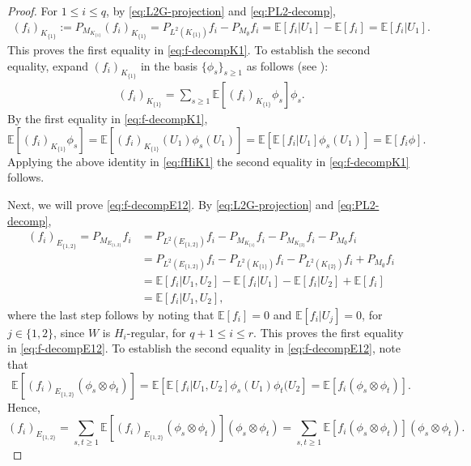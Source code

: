 \documentclass[11pt,reqno]{amsart}
\numberwithin{equation}{section}
\theoremstyle{definition}
\begin{document}
\begin{proof}
For $1 \leq i \leq q$, by \eqref{eq:L2G-projection} and \eqref{eq:PL2-decomp},
\begin{align*}
(f_{i})_{K_{\{1\}}}:= P_{ M_{K_{\{1\}}}} (f_{i})_{K_{\{1\}}} = P_{L^2(K_{\{1\}})} f_{i} -P_{M_\emptyset} f_{i}
= \mathbb E[f_i|U_1]- \mathbb E[f_i] = \mathbb E[f_i|U_1] .
\end{align*}
This proves the first equality in \eqref{eq:f-decompK1}. To establish the second equality, expand $(f_{i})_{K_{\{1\}}}$ in the basis $\{\phi_{s}\}_{s \geq 1}$ as follows (see \cite[Chapter 6]{laxfunctional}): 
\begin{align}\label{eq:fHiK1}
(f_{i})_{K_{\{1\}}} = \sum_{s \geq 1} \mathbb E[ (f_{i})_{K_{\{1\}}} \phi_s]  \phi_s . \end{align}
By the first equality in \eqref{eq:f-decompK1}, 
$$\mathbb E[ (f_{i})_{K_{\{1\}}} \phi_s] = \mathbb E[ (f_{i})_{K_{\{1\}}}(U_1) \phi_s(U_1) ] =  \mathbb E [ \mathbb E[f_i|U_1] \phi_s (U_1) ] = \mathbb E[f_i \phi].$$ 
Applying the above identity in \eqref{eq:fHiK1} the second equality in \eqref{eq:f-decompK1} follows.

Next, we will prove \eqref{eq:f-decompE12}. By \eqref{eq:L2G-projection} and \eqref{eq:PL2-decomp}, 
\begin{align}\label{eq:fE12asEU}
(f_{i})_{E_{\{1,2\}}}= P_{ M_{E_{\{1,2\}}}} f_{i} &= 
P_{L^2(E_{\{1,2\}})} f_{i} - P_{M_{K_{\{ 1 \}}}} f_{i} -  P_{M_{K_{\{ 2 \}}}} f_{i}-P_{M_\emptyset} f_{i} 
\nonumber \\
&= P_{L^2(E_{\{1,2\}})} f_{i} - P_{L^2(K_{\{ 1 \}})} f_{i} - P_{L^2(K_{\{ 2 \}})} f_{i} +P_{M_\emptyset} f_{i} \nonumber \\ 
& = \mathbb E[f_{i} | U_1, U_2] - \mathbb E[f_{i} | U_1 ] - \mathbb E[f_{i} | U_2] + \mathbb E[f_{i}] \nonumber \\ 
& = \mathbb E[f_{i} | U_1, U_2] , 
\end{align} 
where the last step follows by noting that $\mathbb E[ f_{i} ] = 0$ and $\mathbb E[f_i |U_j] =0$, for $j \in \{1, 2\}$, since $W$ is $H_i$-regular, for $q+1 \leq i \leq r$. This proves the first equality in \eqref{eq:f-decompE12}.  To establish the second equality in \eqref{eq:f-decompE12}, note that 
$$\mathbb E[ (f_{i})_{E_{\{1,2\}}} ( \phi_s \otimes \phi_t )  ] =  \mathbb E [ \mathbb E[f_i|U_1, U_2] \phi_s (U_1) \phi_t(U_2 ] = \mathbb E[f_i (\phi_s \otimes \phi_t) ].$$ 
Hence, 
$$ (f_{i})_{E_{\{1,2\}}} = \sum_{s, t \geq 1} \mathbb E[ (f_{i})_{E_{\{1,2\}}}  (\phi_s \otimes \phi_t) ]  (\phi_s \otimes \phi_t) = \sum_{s, t \geq 1} \mathbb E[ f_{i}  (\phi_s \otimes \phi_t) ]  (\phi_s \otimes \phi_t) .$$


\end{proof}
\end{document}
